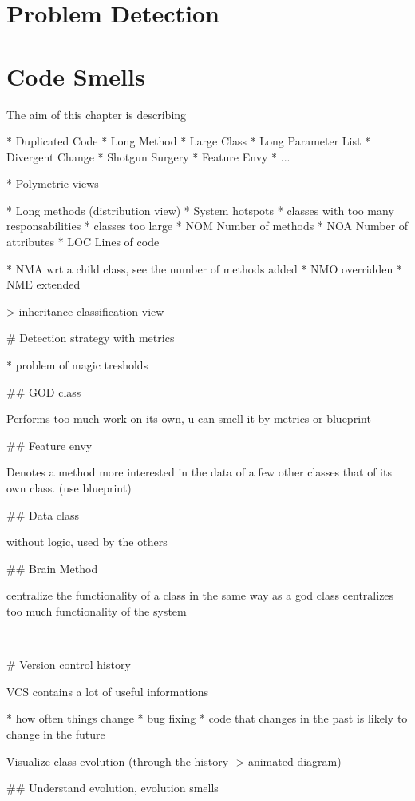 \chapter{Problem Detection}

\chapter{Code Smells}

The aim of this chapter is describing 

* Duplicated Code 
* Long Method 
* Large Class 
* Long Parameter List 
* Divergent Change 
* Shotgun Surgery 
* Feature Envy 
* ...

* Polymetric views

* Long methods (distribution view)
* System hotspots 
    * classes with too many responsabilities
    * classes too large
    * NOM Number of methods
    * NOA Number of attributes
    * LOC Lines of code

    * NMA wrt a child class, see the number of methods added 
    * NMO overridden 
    * NME extended

> inheritance classification view


# Detection strategy with metrics

* problem of magic tresholds


## GOD class 

Performs too much work on its own, 
u can smell it by metrics or blueprint

## Feature envy 

Denotes a method more interested in the data of 
a few other classes that of its own class.
(use blueprint)


## Data class

without logic, used by the others


## Brain Method

centralize the functionality of a class in the same way as a god class centralizes too much 
functionality of the system


---

# Version control history

VCS contains a lot of useful informations

* how often things change
* bug fixing
* code that changes in the past is likely to change in the future

Visualize class evolution (through the history -> animated diagram)


## Understand evolution, evolution smells

